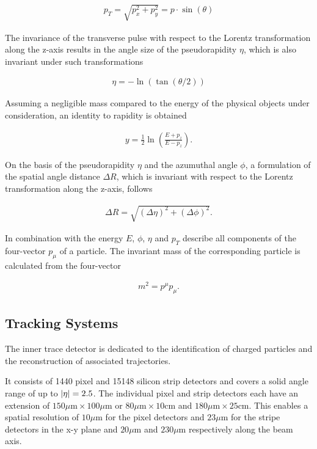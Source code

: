 \documentclass[12pt, a4paper]{thesis}
\begin{document}
\begin{align}
  p_T = \sqrt{p_x^2 + p_y^2} = p \cdot \sin(\theta)
\end{align}

The invariance of the transverse pulse with respect to the Lorentz
transformation along the z-axis results in the angle size of the pseudorapidity
\(\eta\), which is also invariant under such transformations

\begin{align}
  \eta = - \ln(\tan(\theta/2))
\end{align}

Assuming a negligible mass compared to the energy of the physical objects under
consideration, an identity to rapidity is obtained 

\begin{align}
  y = \frac{1}{2} \ln(\frac{E+p_z}{E-p_z}).
\end{align}

On the basis of the pseudorapidity \(\eta\) and the azumuthal angle \(\phi\), a
formulation of the spatial angle distance \(\Delta R\), which is invariant with
respect to the Lorentz transformation along the z-axis, follows

\begin{align}
  \Delta R = \sqrt{(\Delta \eta)^{2} + (\Delta \phi)^{2}}.
\end{align}

In combination with the energy \(E\), \(\phi\), \(\eta\) and \(p_{T}\) describe all components of
the four-vector \(p_{\mu}\) of a particle. The invariant mass of the corresponding
particle is calculated from the four-vector

\begin{align}
  m^{2} = p^{\mu}p_{\mu}.
\end{align}

\subsection{Tracking Systems}
\label{sec:org139ed11}
The inner trace detector is dedicated to the identification of charged particles
and the reconstruction of associated trajectories. 

It consists of 1440 pixel and 15148 silicon strip detectors and covers a solid
angle range of up to \(\abs{\eta} = 2.5\). The individual pixel and strip
detectors each have an extension of \(150\mu \text{m} \times 100 \mu \text{m}\) or
\(80\mu \text{m} \times 10 \text{cm}\) and \(180\mu \text{m} \times 25 \text{cm}\).
This enables a spatial resolution of \(10\mu \text{m}\) for the pixel detectors
and \(23\mu \text{m}\) for the stripe detectors in the x-y plane and \(20\mu
\text{m}\) and \(230\mu \text{m}\) respectively along the beam axis.
\end{document}
